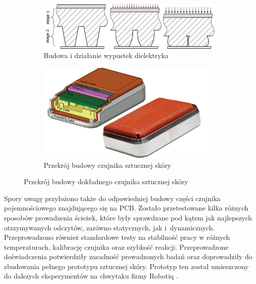 \begin{figure}[!h]
  \begin{subfigure}[t]{0.49\linewidth}
    \centering 
    \includegraphics[width=0.95\linewidth]{img/duck_silikon.png}
    \caption{Budowa i działanie wypustek dielektryka}
  \end{subfigure}
  \begin{subfigure}[t]{0.49\linewidth}
    \centering 
    \includegraphics[width=0.95\linewidth]{img/przekroj_duck.png}
    \caption{Przekrój budowy czujnika sztucznej skóry}
  \end{subfigure}
  
  \centering
  \caption{Przekrój budowy dokładnego czujnika sztucznej skóry \cite{b_konf_kaczka_przekroj}}
  \label{f_przekroj_duck}
\end{figure}

Spory uwagę przyłożono także do odpowiedniej budowy części czujnika pojemnościowego znajdującego się na PCB. Zostało przetestowane kilka różnych sposobów prowadzenia ścieżek, które były sprawdzane pod kątem jak najlepszych otrzymywanych odczytów, zarówno statycznych, jak i~dynamicznych. Przeprowadzono również standardowe testy na stabilność pracy w różnych temperaturach, kalibrację czujnika oraz szybkość reakcji. Przeprowadzone doświadczenia potwierdziły zasadność prowadzonych badań oraz doprowadziły do zbudowania pełnego prototypu sztucznej skóry. Prototyp ten został umieszczony do dalszych eksperymentów na chwytaku firmy Robotiq \cite{b_konf_kaczka_przekroj}.

